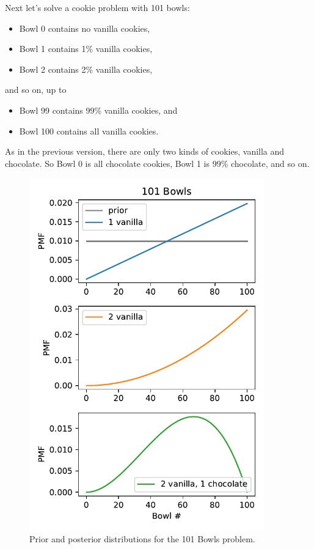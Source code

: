 \documentclass[12pt]{book}
\theoremstyle{exercise}
\begin{document}
Next let's solve a cookie problem with 101 bowls:

\begin{itemize}

\item Bowl 0 contains no vanilla cookies,

\item Bowl 1 contains 1\% vanilla cookies,

\item Bowl 2 contains 2\% vanilla cookies,

\end{itemize}

and so on, up to

\begin{itemize}

\item Bowl 99 contains 99\% vanilla cookies, and

\item Bowl 100 contains all vanilla cookies.

\end{itemize}

As in the previous version, there are only two kinds of cookies, vanilla and chocolate.  So Bowl 0 is all chocolate cookies, Bowl 1 is 99\% chocolate, and so on.

\begin{figure}
\centerline{\includegraphics[width=4in]{figs/fig02-01.pdf}}
\caption{Prior and posterior distributions for the 101 Bowls problem.}
\label{fig02-01}
\end{figure}
\end{document}
